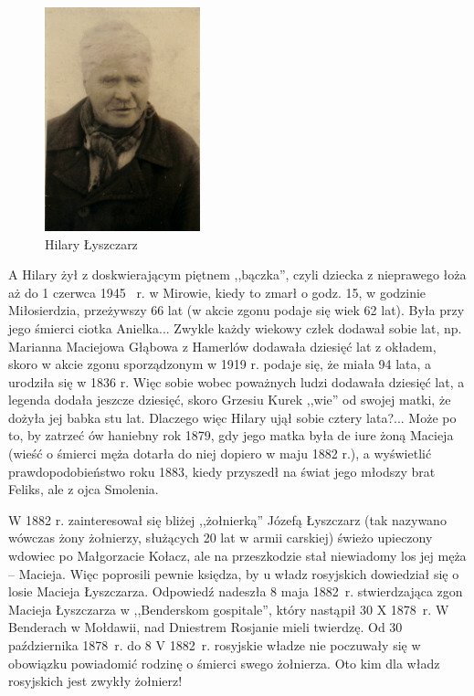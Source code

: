 \begin{figure}[!h]
\begin{center}
\includegraphics[width=0.4\textwidth]{zdjecia/hilary_lyszczarz.jpg}
\caption{Hilary Łyszczarz}
\label{rys:hilary_lyszczarz}
\end{center}
\end{figure}

A Hilary żył z doskwierającym piętnem ,,bączka'', czyli dziecka z nieprawego łoża aż do 1 czerwca 1945~ r. w Mirowie, kiedy to zmarł o godz. 15, w godzinie Miłosierdzia, przeżywszy 66 lat (w akcie zgonu podaje się wiek 62 lat). Była przy jego śmierci ciotka Anielka... Zwykle każdy wiekowy człek dodawał sobie lat, np. Marianna Maciejowa Głąbowa z Hamerlów dodawała dziesięć lat z okładem, skoro w akcie zgonu sporządzonym w 1919 r. podaje się, że miała 94 lata, a urodziła się w 1836 r. Więc sobie  wobec poważnych ludzi dodawała dziesięć lat, a legenda dodała jeszcze dziesięć, skoro Grzesiu Kurek ,,wie'' od swojej matki, że dożyła jej babka stu lat. Dlaczego więc Hilary ujął sobie cztery lata?... Może po to, by zatrzeć ów haniebny rok 1879, gdy jego matka była de iure żoną Macieja (wieść o śmierci męża dotarła do niej dopiero w maju 1882 r.), a wyświetlić prawdopodobieństwo roku 1883, kiedy przyszedł na świat jego młodszy brat Feliks, ale z ojca Smolenia.

W 1882 r. zainteresował się bliżej ,,żołnierką'' Józefą Łyszczarz (tak nazywano wówczas żony żołnierzy, służących 20 lat w armii carskiej) świeżo upieczony wdowiec po Małgorzacie Kołacz, ale na przeszkodzie stał niewiadomy los jej męża -- Macieja. Więc poprosili pewnie księdza, by u władz rosyjskich dowiedział się o losie Macieja Łyszczarza. Odpowiedź nadeszła 8 maja 1882~r. stwierdzająca zgon Macieja Łyszczarza w ,,Benderskom gospitale'', który nastąpił 30 X 1878~r. W Benderach w Mołdawii, nad Dniestrem Rosjanie mieli twierdzę. Od 30 października 1878~r. do 8 V 1882~r. rosyjskie władze nie poczuwały się w obowiązku powiadomić rodzinę o śmierci swego żołnierza. Oto kim dla władz rosyjskich jest zwykły żołnierz!


